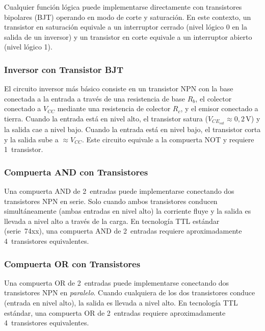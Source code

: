 \documentclass[12pt,letterpaper]{article}
\begin{document}
    Cualquier función lógica puede implementarse directamente con transistores bipolares (BJT)
    operando en modo de corte y saturación. En este contexto, un transistor
    en saturación equivale a un interruptor cerrado (nivel lógico 0 en la salida de un
    inversor) y un transistor en corte equivale a un interruptor abierto (nivel lógico 1).
    
    \subsubsection{Inversor con Transistor BJT}
    
    El circuito inversor más básico consiste en un transistor NPN con la base conectada a la
    entrada a través de una resistencia de base $R_b$, el colector conectado a $V_{CC}$
    mediante una resistencia de colector $R_c$, y el emisor conectado a tierra. Cuando la
    entrada está en nivel alto, el transistor satura ($V_{CE_{sat}} \approx 0{,}2\,\text{V}$)
    y la salida cae a nivel bajo. Cuando la entrada está en nivel bajo, el transistor corta
    y la salida sube a $\approx V_{CC}$. Este circuito equivale a la compuerta NOT y requiere
    1~transistor.
    
    \subsubsection{Compuerta AND con Transistores}
    
    Una compuerta AND de 2~entradas puede implementarse conectando dos transistores NPN
    en serie. Solo cuando ambos transistores conducen simultáneamente (ambas entradas
    en nivel alto) la corriente fluye y la salida es llevada a nivel alto a través de la
    carga. En tecnología TTL estándar (serie~74xx), una compuerta AND de 2~entradas requiere
    aproximadamente 4~transistores equivalentes.
    
    \subsubsection{Compuerta OR con Transistores}
    
    Una compuerta OR de 2~entradas puede implementarse conectando dos transistores NPN en
    \emph{paralelo}. Cuando cualquiera de los dos transistores conduce (entrada en nivel alto),
    la salida es llevada a nivel alto. En tecnología TTL estándar, una compuerta OR de
    2~entradas requiere aproximadamente 4~transistores equivalentes.
    
\end{document}
